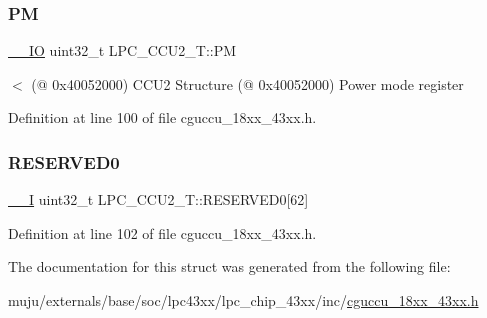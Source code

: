 \subsubsection{\texorpdfstring{PM}{PM}}
{\footnotesize\ttfamily \hyperlink{core__sc300_8h_aec43007d9998a0a0e01faede4133d6be}{\+\_\+\+\_\+\+IO} uint32\+\_\+t L\+P\+C\+\_\+\+C\+C\+U2\+\_\+\+T\+::\+PM}

$<$ (@ 0x40052000) C\+C\+U2 Structure (@ 0x40052000) Power mode register 

Definition at line 100 of file cguccu\+\_\+18xx\+\_\+43xx.\+h.

\mbox{\label{struct_l_p_c___c_c_u2___t_a97cef166775797bdbe093cd4022ab36f}} 
\subsubsection{\texorpdfstring{R\+E\+S\+E\+R\+V\+E\+D0}{RESERVED0}}
{\footnotesize\ttfamily \hyperlink{core__sc300_8h_af63697ed9952cc71e1225efe205f6cd3}{\+\_\+\+\_\+I} uint32\+\_\+t L\+P\+C\+\_\+\+C\+C\+U2\+\_\+\+T\+::\+R\+E\+S\+E\+R\+V\+E\+D0\mbox{[}62\mbox{]}}



Definition at line 102 of file cguccu\+\_\+18xx\+\_\+43xx.\+h.



The documentation for this struct was generated from the following file\+:\begin{DoxyCompactItemize}
\item 
muju/externals/base/soc/lpc43xx/lpc\+\_\+chip\+\_\+43xx/inc/\hyperlink{cguccu__18xx__43xx_8h}{cguccu\+\_\+18xx\+\_\+43xx.\+h}\end{DoxyCompactItemize}
